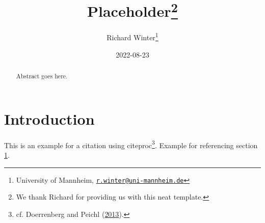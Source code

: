 \documentclass[
  12pt,
]{article}
\title{Placeholder\footnote{We thank Richard for providing us with this neat template.}}
\author{Richard Winter\footnote{University of Mannheim, \href{mailto:r.winter@uni-mannheim.de}{\nolinkurl{r.winter@uni-mannheim.de}}}}
\date{2022-08-23}
\begin{document}
\maketitle
\begin{abstract}
Abstract goes here.
\end{abstract}

\newpage

\hypertarget{intro}{%
\section{Introduction}\label{intro}}

This is an example for a citation using citeproc\footnote{cf. Doerrenberg and Peichl (\protect\hyperlink{ref-doerrenberg2013progressive}{2013}).}. Example for referencing section \ref{intro}.
\end{document}

